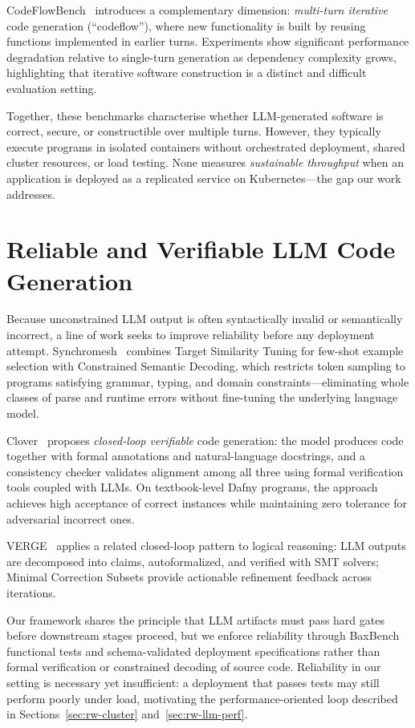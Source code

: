 CodeFlowBench~\cite{wang2025codeflowbench} introduces a complementary dimension:
\emph{multi-turn iterative} code generation (``codeflow''), where new
functionality is built by reusing functions implemented in earlier turns.
Experiments show significant performance degradation relative to single-turn
generation as dependency complexity grows, highlighting that iterative software
construction is a distinct and difficult evaluation setting.

Together, these benchmarks characterise whether LLM-generated software is
correct, secure, or constructible over multiple turns.  However, they
typically execute programs in isolated containers without orchestrated
deployment, shared cluster resources, or load testing.  None measures
\emph{sustainable throughput} when an application is deployed as a replicated
service on Kubernetes---the gap our work addresses.


\section{Reliable and Verifiable LLM Code Generation}
\label{sec:rw-reliability}

Because unconstrained LLM output is often syntactically invalid or semantically
incorrect, a line of work seeks to improve reliability before any deployment
attempt.  Synchromesh~\cite{poesia2022synchromesh} combines Target Similarity
Tuning for few-shot example selection with Constrained Semantic Decoding, which
restricts token sampling to programs satisfying grammar, typing, and domain
constraints---eliminating whole classes of parse and runtime errors without
fine-tuning the underlying language model.

Clover~\cite{sun2023clover} proposes \emph{closed-loop verifiable} code
generation: the model produces code together with formal annotations and
natural-language docstrings, and a consistency checker validates alignment among
all three using formal verification tools coupled with LLMs.  On textbook-level
Dafny programs, the approach achieves high acceptance of correct instances while
maintaining zero tolerance for adversarial incorrect ones.

VERGE~\cite{singh2026verge} applies a related closed-loop pattern to logical
reasoning: LLM outputs are decomposed into claims, autoformalized, and verified
with SMT solvers; Minimal Correction Subsets provide actionable refinement
feedback across iterations.

Our framework shares the principle that LLM artifacts must pass hard gates
before downstream stages proceed, but we enforce reliability through BaxBench
functional tests and schema-validated deployment specifications rather than
formal verification or constrained decoding of source code.  Reliability in our
setting is necessary yet insufficient: a deployment that passes tests may still
perform poorly under load, motivating the performance-oriented loop described in
Sections~\ref{sec:rw-cluster} and~\ref{sec:rw-llm-perf}.


